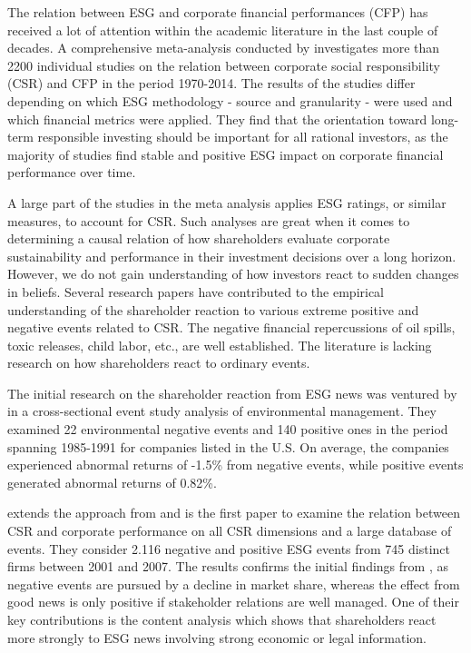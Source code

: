 


The relation between ESG and corporate financial performances (CFP) has received a lot of attention within the academic literature in the last couple of decades. A comprehensive meta-analysis conducted by \cite{ESG_meta_analysis} investigates more than 2200 individual studies on the relation between corporate social responsibility (CSR) and CFP in the period 1970-2014. The results of the studies differ depending on which ESG methodology - source and granularity - were used and which financial metrics were applied. They find that the orientation toward long-term responsible investing should be important for all rational investors, as the majority of studies find stable and positive ESG impact on corporate financial performance over time. 

A large part of the studies in the meta analysis applies ESG ratings, or similar measures, to account for CSR. Such analyses are great when it comes to determining a causal relation of how shareholders evaluate corporate sustainability and performance in their investment decisions over a long horizon. However, we do not gain understanding of how investors react to sudden changes in beliefs. Several research papers have contributed to the empirical understanding of the shareholder reaction to various extreme positive and negative events related to CSR. The negative financial repercussions of oil spills, toxic releases, child labor, etc., are well established. The literature is lacking research on how shareholders react to ordinary events. 

The initial research on the shareholder reaction from ESG news was ventured by \cite{klassen1996impact} in a cross-sectional event study analysis of environmental management. They examined 22 environmental negative events and 140 positive ones in the period spanning 1985-1991 for companies listed in the U.S. On average, the companies experienced abnormal returns of -1.5\% from negative events, while positive events generated abnormal returns of 0.82\%. 

\cite{kruger2015corporate} extends the approach from \citeauthor{klassen1996impact} and is the first paper to examine the relation between CSR and corporate performance on all CSR dimensions and a large database of events. They consider 2.116 negative and positive ESG events from 745 distinct firms between 2001 and 2007. The results confirms the initial findings from \citeauthor{klassen1996impact}, as negative events are pursued by a decline in market share, whereas the effect from good news is only positive if stakeholder relations are well managed. One of their key contributions is the content analysis which shows that shareholders react more strongly to ESG news involving strong economic or legal information. 


